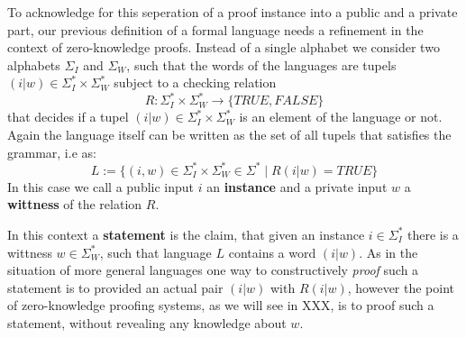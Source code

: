 To acknowledge for this seperation of a proof instance into a public and a private part, our previous definition of a formal language needs a refinement in the context of zero-knowledge proofs. Instead of a single alphabet we consider two alphabets $\Sigma_I$ and $\Sigma_W$, such that the words of the languages are tupels $(i|w)\in \Sigma_I^* \times \Sigma_W^*$ subject to a checking relation
\begin{equation}
R: \Sigma_I^* \times \Sigma_W^* \to \{TRUE, FALSE\}
\end{equation}
that decides if a tupel $(i|w)\in \Sigma_I^* \times \Sigma_W^*$ is an element of the language or not. Again the language itself can be written as the set of all tupels that satisfies the grammar, i.e as:
\begin{equation}
L := \{(i,w)\in \Sigma_I^* \times \Sigma_W^*\in \Sigma^*\;|\; R(i|w)=TRUE\}
\end{equation}
In this case we call a public input $i$ an \textbf{instance} and a private input $w$ a \textbf{wittness} of the relation $R$.

In this context a \textbf{statement} is the claim, that given an instance $i\in\Sigma_I^*$ there is a wittness $w\in \Sigma_W^*$, such that language $L$ contains a word $(i|w)$. As in the situation of more general languages one way to constructively \textit{proof} such a statement is to provided an actual pair $(i|w)$ with $R(i|w)$, however the point of zero-knowledge proofing systems, as we will see in XXX, is to proof such a statement, without revealing any knowledge about $w$. 

